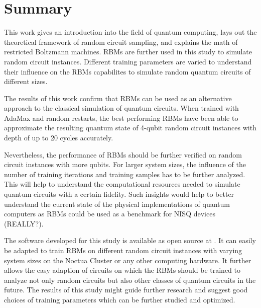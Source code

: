 \chapter{Summary}

This work gives an introduction into the field of quantum computing, lays out the theoretical framework 
of random circuit sampling, and explains the math of restricted Boltzmann machines. RBMs are further used 
in this study to simulate random circuit instances. Different training parameters are varied to understand their 
influence on the RBMs capabilites to simulate random quantum circuits of different sizes. 

The results of this work confirm that RBMs can be used as an alternative approach to the classical 
simulation of quantum circuits. When trained with AdaMax and random restarts, the best performing RBMs
have been able to approximate the resulting quantum state of 4-qubit random circuit instances with depth 
of up to 20 cycles accurately. 

Nevertheless, the performance of RBMs should be further verified on random circuit instances with more qubits. 
For larger system sizes, the influence of the number of training iterations and training samples has to be further 
analyzed. This will help to understand the computational resources needed to simulate quantum circuits 
with a certain fidelity. Such insights would help to better understand the current state of the physical 
implementations of quantum computers as RBMs could be used as a benchmark for NISQ devices (REALLY?).

The software developed for this study is available as open source at \cite{}. It can easily be adapted to 
train RBMs on different random circuit instances with varying system sizes on the Noctua Cluster or any other 
computing hardware. It further allows the easy adaption of circuits on which the RBMs should be trained to 
analyze not only random circuits but also other classes of quantum circuits in the future. The results of this 
study might guide further research and suggest good choices of training parameters which can be further studied and 
optimized.
